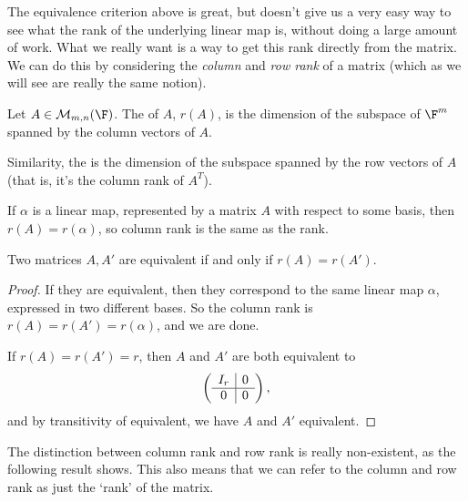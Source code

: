 The equivalence criterion above is great, but doesn't give us a very easy way to see what the rank of the underlying linear map is, without doing a large amount of work. What we really want is a way to get this rank directly from the matrix. We can do this by considering the \emph{column} and \emph{row rank} of a matrix (which as we will see are really the same notion).

\begin{definition}
    Let $A \in \mathcal{M}_{m, n}(\F)$. The  of $A$, $r(A)$, is the dimension of the subspace of $\F^m$ spanned by the column vectors of $A$.

    Similarity, the  is the dimension of the subspace spanned by the row vectors of $A$ (that is, it's the column rank of $A^T$).
\end{definition}

\begin{remark}
    If $\alpha$ is a linear map, represented by a matrix $A$ with respect to some basis, then $r(A) = r(\alpha)$, so column rank is the same as the rank.
\end{remark}

\begin{proposition}
    Two matrices $A, A'$ are equivalent if and only if $r(A) = r(A')$.
\end{proposition}
\begin{proof}
    If they are equivalent, then they correspond to the same linear map $\alpha$, expressed in two different bases. So the column rank is $r(A) = r(A') = r(\alpha)$, and we are done.

    If $r(A) = r(A') = r$, then $A$ and $A'$ are both equivalent to
    $$
    \left(\begin{array}{ c | c }
        I_r & 0 \\
        \hline
        0 & 0
      \end{array}\right),
      $$
      and by transitivity of equivalent, we have $A$ and $A'$ equivalent.
\end{proof}

The distinction between column rank and row rank is really non-existent, as the following result shows. This also means that we can refer to the column and row rank as just the `rank' of the matrix.

